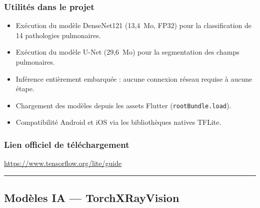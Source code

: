 \documentclass[12pt,a4paper]{report}
\begin{document}
\subsubsection*{Utilités dans le projet}
\begin{itemize}
  \item Exécution du modèle DenseNet121 (13,4~Mo, FP32) pour la classification de 14 pathologies pulmonaires.
  \item Exécution du modèle U-Net (29,6~Mo) pour la segmentation des champs pulmonaires.
  \item Inférence entièrement embarquée : aucune connexion réseau requise à aucune étape.
  \item Chargement des modèles depuis les assets Flutter (\texttt{rootBundle.load}).
  \item Compatibilité Android et iOS via les bibliothèques natives TFLite.
\end{itemize}

\subsubsection*{Lien officiel de téléchargement}
\url{https://www.tensorflow.org/lite/guide}

\medskip\hrule\medskip

\subsection{Modèles IA --- TorchXRayVision}
\end{document}

